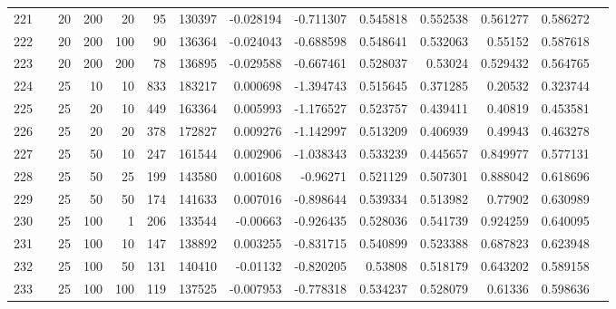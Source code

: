 \begin{longtable}{llrrrrrrrrrrrr}
		221 & &           20 &               200 &           20 &          95 &     130397 & -0.028194 & -0.711307 &  0.545818 &    0.552538 &       0.561277 &  0.586272 \\
		222 & &           20 &               200 &          100 &          90 &     136364 & -0.024043 & -0.688598 &  0.548641 &    0.532063 &        0.55152 &  0.587618 \\
		223 & &           20 &               200 &          200 &          78 &     136895 & -0.029588 & -0.667461 &  0.528037 &     0.53024 &       0.529432 &  0.564765 \\
		224 & &           25 &                10 &           10 &         833 &     183217 &  0.000698 & -1.394743 &  0.515645 &    0.371285 &        0.20532 &  0.323744 \\
		225 & &           25 &                20 &           10 &         449 &     163364 &  0.005993 & -1.176527 &  0.523757 &    0.439411 &        0.40819 &  0.453581 \\
		226 & &           25 &                20 &           20 &         378 &     172827 &  0.009276 & -1.142997 &  0.513209 &    0.406939 &        0.49943 &  0.463278 \\
		227 & &           25 &                50 &           10 &         247 &     161544 &  0.002906 & -1.038343 &  0.533239 &    0.445657 &       0.849977 &  0.577131 \\
		228 & &           25 &                50 &           25 &         199 &     143580 &  0.001608 &  -0.96271 &  0.521129 &    0.507301 &       0.888042 &  0.618696 \\
		229 & &           25 &                50 &           50 &         174 &     141633 &  0.007016 & -0.898644 &  0.539334 &    0.513982 &        0.77902 &  0.630989 \\
		230 & &           25 &               100 &            1 &         206 &     133544 &  -0.00663 & -0.926435 &  0.528036 &    0.541739 &       0.924259 &  0.640095 \\
		231 & &           25 &               100 &           10 &         147 &     138892 &  0.003255 & -0.831715 &  0.540899 &    0.523388 &       0.687823 &  0.623948 \\
		232 & &           25 &               100 &           50 &         131 &     140410 &  -0.01132 & -0.820205 &   0.53808 &    0.518179 &       0.643202 &  0.589158 \\
		233 & &           25 &               100 &          100 &         119 &     137525 & -0.007953 & -0.778318 &  0.534237 &    0.528079 &        0.61336 &  0.598636 \\

\end{longtable}
